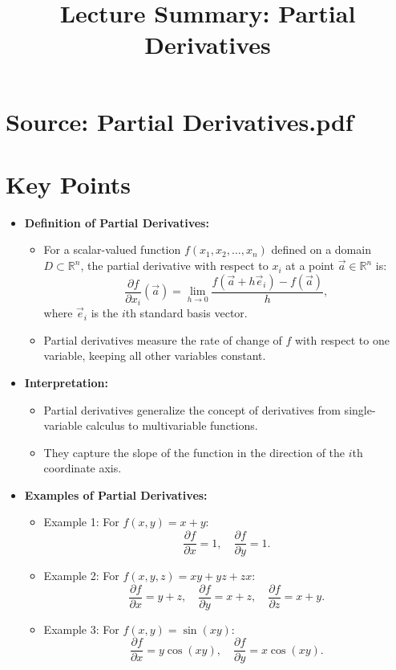 \documentclass{article}
\title{Lecture Summary: Partial Derivatives}
\author{}
\date{}
\begin{document}
\maketitle

\section*{Source: Partial Derivatives.pdf}

\section*{Key Points}

\begin{itemize}
  \item \textbf{Definition of Partial Derivatives:}
    \begin{itemize}
      \item For a scalar-valued function $f(x_1, x_2, \dots, x_n)$ defined on a domain $D \subset \mathbb{R}^n$, the partial derivative with respect to $x_i$ at a point $\vec{a} \in \mathbb{R}^n$ is:
        \[
          \frac{\partial f}{\partial x_i}(\vec{a}) = \lim_{h \to 0} \frac{f(\vec{a} + h\vec{e}_i) - f(\vec{a})}{h},
        \]
        where $\vec{e}_i$ is the $i$th standard basis vector.
      \item Partial derivatives measure the rate of change of $f$ with respect to one variable, keeping all other variables constant.
    \end{itemize}

  \item \textbf{Interpretation:}
    \begin{itemize}
      \item Partial derivatives generalize the concept of derivatives from single-variable calculus to multivariable functions.
      \item They capture the slope of the function in the direction of the $i$th coordinate axis.
    \end{itemize}

  \item \textbf{Examples of Partial Derivatives:}
    \begin{itemize}
      \item Example 1: For $f(x, y) = x + y$:
        \[
          \frac{\partial f}{\partial x} = 1, \quad \frac{\partial f}{\partial y} = 1.
        \]
      \item Example 2: For $f(x, y, z) = xy + yz + zx$:
        \[
          \frac{\partial f}{\partial x} = y + z, \quad \frac{\partial f}{\partial y} = x + z, \quad \frac{\partial f}{\partial z} = x + y.
        \]
      \item Example 3: For $f(x, y) = \sin(xy)$:
        \[
          \frac{\partial f}{\partial x} = y\cos(xy), \quad \frac{\partial f}{\partial y} = x\cos(xy).
        \]
    \end{itemize}


\end{itemize}
\end{document}
